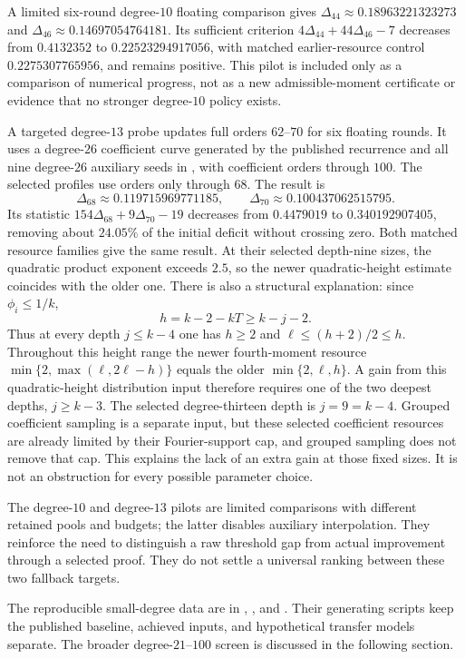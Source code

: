 \documentclass[11pt,letterpaper]{article}
\numberwithin{equation}{section}
\begin{document}
A limited six-round degree-$10$ floating comparison gives
$\Delta_{44}\approx0.18963221323273$ and
$\Delta_{46}\approx0.14697054764181$. Its sufficient criterion
$4\Delta_{44}+44\Delta_{46}-7$ decreases from $0.4132352$ to
$0.22523294917056$, with matched earlier-resource control
$0.2275307765956$, and remains positive. This pilot is included only as a
comparison of numerical progress, not as a new admissible-moment certificate
or evidence that no stronger degree-$10$ policy exists.

A targeted degree-$13$ probe updates full orders $62$--$70$ for six
floating rounds. It uses a degree-$26$ coefficient curve generated by the
published recurrence and all nine degree-$26$ auxiliary seeds in
\cite[Section~23]{VW00}, with coefficient
orders through $100$. The selected profiles use orders only through $68$.
The result is
\[
 \Delta_{68}\approx0.119715969771185,\qquad
 \Delta_{70}\approx0.100437062515795.
\]
Its statistic $154\Delta_{68}+9\Delta_{70}-19$ decreases from
$0.4479019$ to $0.340192907405$, removing about $24.05\%$ of the
initial deficit without crossing zero. Both matched resource families
give the same result. At their selected depth-nine sizes, the quadratic
product exponent exceeds $2.5$, so the newer quadratic-height estimate
coincides with the older one. There is also a structural explanation:
since $\phi_i\le1/k$,
\[
 h=k-2-kT\ge k-j-2.
\]
Thus at every depth $j\le k-4$ one has $h\ge2$ and
$\ell\le(h+2)/2\le h$. Throughout this height range the newer fourth-moment
resource $\min\{2,\max(\ell,2\ell-h)\}$ equals the older
$\min\{2,\ell,h\}$. A gain from this quadratic-height distribution input
therefore requires one of the two deepest depths, $j\ge k-3$.
The selected degree-thirteen depth is $j=9=k-4$.
Grouped coefficient sampling is a separate input, but these selected
coefficient resources are already
limited by their Fourier-support cap, and grouped sampling does not
remove that cap. This explains the lack of an extra gain at those fixed
sizes. It is not an obstruction for every possible parameter choice.

The degree-$10$ and degree-$13$ pilots are limited comparisons with
different retained pools and budgets; the latter disables auxiliary
interpolation. They reinforce the need to distinguish a raw threshold
gap from actual improvement through a selected proof. They do not settle
a universal ranking between these two fallback targets.

The reproducible small-degree data are in
,
, and
. Their generating scripts keep
the published baseline, achieved inputs, and hypothetical transfer models
separate. The broader degree-$21$--$100$ screen is discussed in the following
section.
\end{document}
